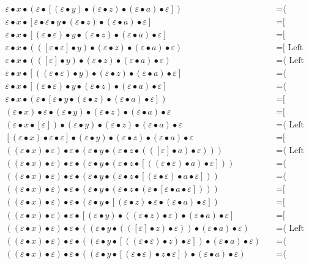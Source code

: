 \documentclass{article}
\begin{document}
\begin{align*}
ε • x • (ε • [(ε • y) • (ε • z) • (ε • a) • ε])
  & \quad \text{=⟨ Associativity ]}\\
ε • x • [ε • ε • y • (ε • z) • (ε • a) • ε]
  & \quad \text{=[ Associativity ⟩}\\
ε • x • [(ε • ε) • y • (ε • z) • (ε • a) • ε]
  & \quad \text{=[ Associativity ⟩}\\
ε • x • (([ε • ε] • y) • (ε • z) • (ε • a) • ε)
  & \quad \text{=[ Left neutrality ⟩}\\
ε • x • (([ε] • y) • (ε • z) • (ε • a) • ε)
  & \quad \text{=⟨ Left neutrality ]}\\
ε • x • [((ε • ε) • y) • (ε • z) • (ε • a) • ε]
  & \quad \text{=⟨ Associativity ]}\\
ε • x • [(ε • ε) • y • (ε • z) • (ε • a) • ε]
  & \quad \text{=⟨ Associativity ]}\\
ε • x • (ε • [ε • y • (ε • z) • (ε • a) • ε])
  & \quad \text{=[ Associativity ⟩}\\
(ε • x) • ε • (ε • y) • (ε • z) • (ε • a) • ε
  & \quad \text{=[ Associativity ⟩}\\
(ε • x • [ε]) • (ε • y) • (ε • z) • (ε • a) • ε
  & \quad \text{=⟨ Left neutrality ]}\\
[(ε • x) • ε • ε] • (ε • y) • (ε • z) • (ε • a) • ε
  & \quad \text{=[ Associativity ⟩}\\
((ε • x) • ε) • ε • (ε • y • (ε • z • (([ε] • a) • ε)))
  & \quad \text{=⟨ Left neutrality ]}\\
((ε • x) • ε) • ε • (ε • y • (ε • z • [((ε • ε) • a) • ε]))
  & \quad \text{=⟨ Associativity ]}\\
((ε • x) • ε) • ε • (ε • y • (ε • z • [(ε • ε) • a • ε]))
  & \quad \text{=⟨ Associativity ]}\\
((ε • x) • ε) • ε • (ε • y • (ε • z • (ε • [ε • a • ε])))
  & \quad \text{=[ Associativity ⟩}\\
((ε • x) • ε) • ε • (ε • y • [(ε • z) • ε • (ε • a) • ε])
  & \quad \text{=[ Associativity ⟩}\\
((ε • x) • ε) • ε • [(ε • y) • ((ε • z) • ε) • (ε • a) • ε]
  & \quad \text{=[ Associativity ⟩}\\
((ε • x) • ε) • ε • ((ε • y • (([ε] • z) • ε)) • (ε • a) • ε)
  & \quad \text{=⟨ Left neutrality ]}\\
((ε • x) • ε) • ε • ((ε • y • [((ε • ε) • z) • ε]) • (ε • a) • ε)
  & \quad \text{=⟨ Associativity ]}\\
((ε • x) • ε) • ε • ((ε • y • [(ε • ε) • z • ε]) • (ε • a) • ε)
  & \quad \text{=⟨ Associativity ]}\\

\end{align*}
\end{document}
